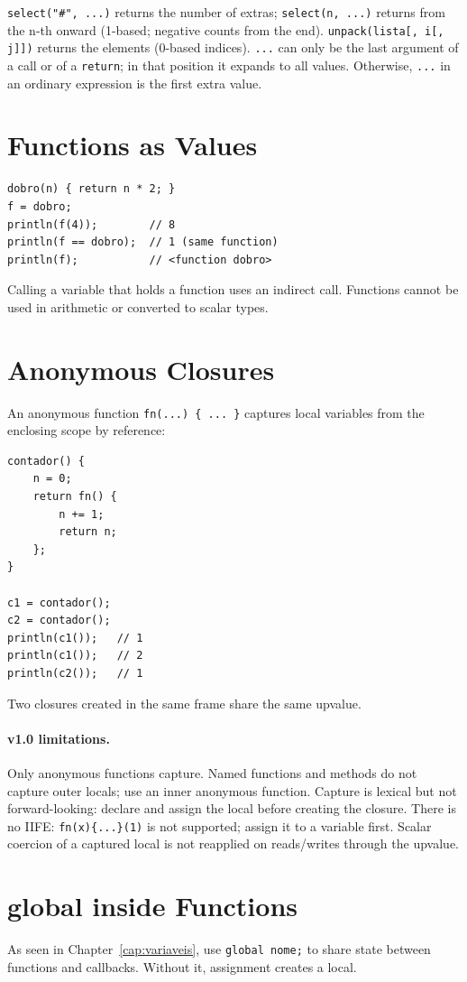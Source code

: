 \documentclass[11pt,a4paper,oneside]{report}
\newcommand{\code}[1]{\texttt{#1}}
\begin{document}
\code{select("\#", ...)} returns the number of extras;
\code{select(n, ...)} returns from the n-th onward (1-based; negative
counts from the end). \code{unpack(lista[, i[, j]])} returns the elements
(0-based indices). \code{...} can only be the last argument of a call or
of a \code{return}; in that position it expands to all values. Otherwise,
\code{...} in an ordinary expression is the first extra value.

\section{Functions as Values}
\begin{lstlisting}
dobro(n) { return n * 2; }
f = dobro;
println(f(4));        // 8
println(f == dobro);  // 1 (same function)
println(f);           // <function dobro>
\end{lstlisting}

Calling a variable that holds a function uses an indirect call.
Functions cannot be used in arithmetic or converted to scalar types.

\section{Anonymous Closures}
An anonymous function \code{fn(...) \{ ... \}} captures local variables
from the enclosing scope by reference:

\begin{lstlisting}
contador() {
    n = 0;
    return fn() {
        n += 1;
        return n;
    };
}

c1 = contador();
c2 = contador();
println(c1());   // 1
println(c1());   // 2
println(c2());   // 1
\end{lstlisting}

Two closures created in the same frame share the same upvalue.

\paragraph{v1.0 limitations.}
Only anonymous functions capture. Named functions and methods do not
capture outer locals; use an inner anonymous function. Capture is lexical
but not forward-looking: declare and assign the local before creating the
closure. There is no IIFE: \code{fn(x)\{...\}(1)} is not supported;
assign it to a variable first. Scalar coercion of a captured local is not
reapplied on reads/writes through the upvalue.

\section{global inside Functions}
As seen in Chapter~\ref{cap:variaveis}, use \code{global nome;} to share
state between functions and callbacks. Without it, assignment creates a
local.
\end{document}
